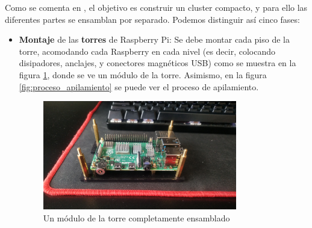 Como se comenta en , el objetivo es construir un cluster compacto, y para ello las diferentes partes se ensamblan por separado. Podemos distinguir así cinco fases:
\begin{itemize}
    \item \textbf{Montaje} de las \textbf{torres} de Raspberry Pi: Se debe montar cada piso de la torre, acomodando cada Raspberry en cada nivel (es decir, colocando disipadores, anclajes, y conectores magnéticos USB) como se muestra en la figura \ref{fig:modulo_raspi_torre}, donde se ve un módulo de la torre. Asimismo, en la figura \ref{fig:proceso_apilamiento} se puede ver el proceso de apilamiento.

    \begin{figure}[h!]
    \centering
    \includegraphics[width=0.8\textwidth]{img/modulo_raspi_torre.jpg}
    \caption{Un módulo de la torre completamente ensamblado}
    \label{fig:modulo_raspi_torre}
    \end{figure}


\end{itemize}
